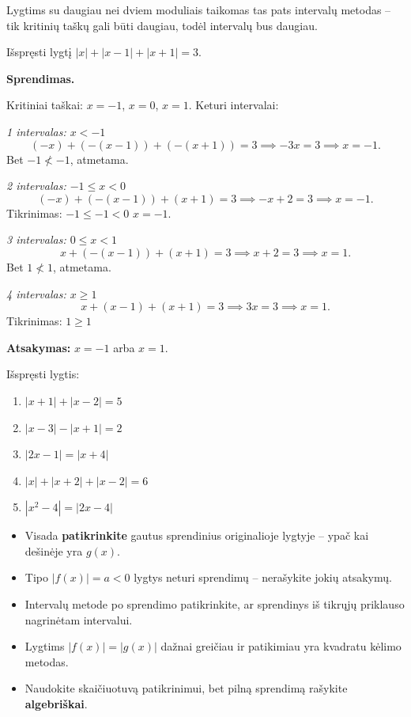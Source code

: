\begin{remark}
Lygtims su daugiau nei dviem moduliais taikomas tas pats intervalų metodas -- tik kritinių taškų gali būti daugiau, todėl intervalų bus daugiau.
\end{remark}

\begin{example}
Išspręsti lygtį $|x| + |x - 1| + |x + 1| = 3$.

\textbf{Sprendimas.}

Kritiniai taškai: $x = -1$, $x = 0$, $x = 1$. Keturi intervalai:

\medskip
\textit{1 intervalas: $x < -1$}
\[
(-x) + (-(x-1)) + (-(x+1)) = 3 \implies -3x = 3 \implies x = -1.
\]
Bet $-1 \not< -1$, atmetama.

\textit{2 intervalas: $-1 \leq x < 0$}
\[
(-x) + (-(x-1)) + (x+1) = 3 \implies -x + 2 = 3 \implies x = -1.
\]
Tikrinimas: $-1 \leq -1 < 0$ \checkmark \quad $x = -1$.

\textit{3 intervalas: $0 \leq x < 1$}
\[
x + (-(x-1)) + (x+1) = 3 \implies x + 2 = 3 \implies x = 1.
\]
Bet $1 \not< 1$, atmetama.

\textit{4 intervalas: $x \geq 1$}
\[
x + (x-1) + (x+1) = 3 \implies 3x = 3 \implies x = 1.
\]
Tikrinimas: $1 \geq 1$ \checkmark

\textbf{Atsakymas:} $x = -1$ arba $x = 1$.
\end{example}

\begin{exercise}
Išspręsti lygtis:
\begin{enumerate}[label=\alph*)]
    \item $|x + 1| + |x - 2| = 5$
    \item $|x - 3| - |x + 1| = 2$
    \item $|2x - 1| = |x + 4|$
    \item $|x| + |x + 2| + |x - 2| = 6$
    \item $|x^2 - 4| = |2x - 4|$
\end{enumerate}
\end{exercise}

\begin{tcolorbox}[colback=yellow!10!white, colframe=orange!70!black, title=VBE patarimai: lygtys su moduliais]
\begin{itemize}
    \item Visada \textbf{patikrinkite} gautus sprendinius originalioje lygtyje -- ypač kai dešinėje yra $g(x)$.
    \item Tipo $|f(x)| = a < 0$ lygtys neturi sprendimų -- nerašykite jokių atsakymų.
    \item Intervalų metode po sprendimo patikrinkite, ar sprendinys iš tikrųjų priklauso nagrinėtam intervalui.
    \item Lygtims $|f(x)| = |g(x)|$ dažnai greičiau ir patikimiau yra kvadratu kėlimo metodas.
    \item Naudokite skaičiuotuvą patikrinimui, bet pilną sprendimą rašykite \textbf{algebriškai}.
\end{itemize}
\end{tcolorbox}

